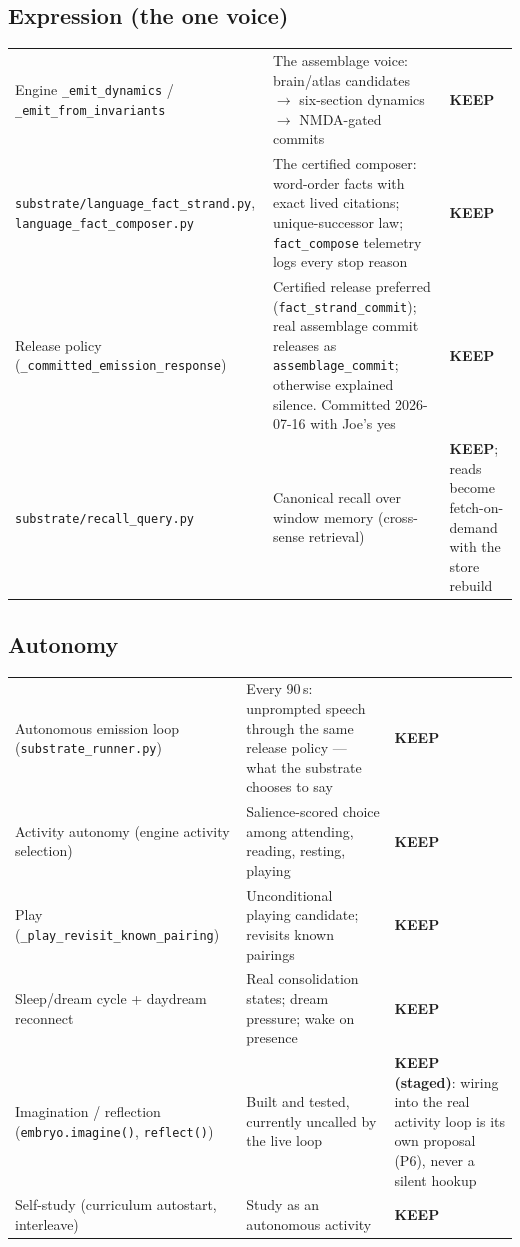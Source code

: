 \documentclass[11pt]{article}
\newcommand{\keep}{\textbf{KEEP}}
\newcommand{\keepstaged}{\textbf{KEEP (staged)}}
\begin{document}
\subsection{Expression (the one voice)}
\begin{longtable}{p{} p{} p{}}
\toprule
Engine \texttt{\_emit\_dynamics} / \texttt{\_emit\_from\_invariants} &
The assemblage voice: brain/atlas candidates $\to$ six-section dynamics
$\to$ NMDA-gated commits &
\keep{} \\
\texttt{substrate/language\_fact\_strand.py},
\texttt{language\_fact\_composer.py} &
The certified composer: word-order facts with exact lived citations;
unique-successor law; \texttt{fact\_compose} telemetry logs every stop
reason &
\keep{} \\
Release policy (\texttt{\_committed\_emission\_response}) &
Certified release preferred (\texttt{fact\_strand\_commit}); real
assemblage commit releases as \texttt{assemblage\_commit}; otherwise
explained silence. Committed 2026-07-16 with Joe's yes &
\keep{} \\
\texttt{substrate/recall\_query.py} &
Canonical recall over window memory (cross-sense retrieval) &
\keep{}; reads become fetch-on-demand with the store rebuild \\
\bottomrule
\end{longtable}

\subsection{Autonomy}
\begin{longtable}{p{} p{} p{}}
\toprule
Autonomous emission loop (\texttt{substrate\_runner.py}) &
Every 90\,s: unprompted speech through the same release policy — what the
substrate chooses to say &
\keep{} \\
Activity autonomy (engine activity selection) &
Salience-scored choice among attending, reading, resting, playing &
\keep{} \\
Play (\texttt{\_play\_revisit\_known\_pairing}) &
Unconditional playing candidate; revisits known pairings &
\keep{} \\
Sleep/dream cycle + daydream reconnect &
Real consolidation states; dream pressure; wake on presence &
\keep{} \\
Imagination / reflection (\texttt{embryo.imagine()},
\texttt{reflect()}) &
Built and tested, currently uncalled by the live loop &
\keepstaged{}: wiring into the real activity loop is its own proposal
(P6), never a silent hookup \\
Self-study (curriculum autostart, interleave) &
Study as an autonomous activity &
\keep{} \\
\bottomrule
\end{longtable}
\end{document}
